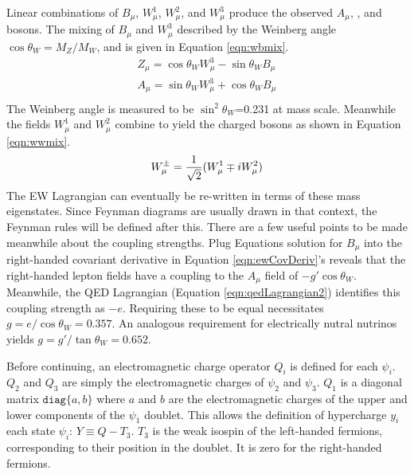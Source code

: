 Linear combinations of $B_\mu$, $W_\mu^1$, $W_\mu^2$, and $W_\mu^3$ produce the observed $A_\mu$, \Z, and \W bosons.
The mixing of $B_\mu$ and $W_\mu^3$ described by the Weinberg angle $\cos\theta_W=M_Z/M_W$, and is given in Equation \ref{eqn:wbmix}.
\begin{equation}\begin{split}\label{eqn:wbmix}
    Z_\mu=\cos\theta_W W^3_\mu-\sin\theta_W B_\mu \\
    A_\mu=\sin\theta_W W^3_\mu+\cos\theta_W B_\mu \\
\end{split}\end{equation}
The Weinberg angle is measured to be $\sin^2\theta_W$=0.231 at \Z mass scale.
Meanwhile the fields $W_\mu^1$ and $W_\mu^2$ combine to yield the charged \W bosons as shown in Equation \ref{eqn:wwmix}.
\begin{equation}\begin{split}\label{eqn:wwmix}
    W^\pm_\mu=\frac{1}{\sqrt{2}}(W_\mu^1\mp iW_\mu^2)
\end{split}\end{equation}
The EW Lagrangian can eventually be re-written in terms of these mass eigenstates.
Since Feynman diagrams are usually drawn in that context, the Feynman rules will be defined after this.
There are a few useful points to be made meanwhile about the coupling strengths.
Plug Equations \label{eqn:wbmix} solution for $B_\mu$ into the right-handed covariant derivative in Equation \ref{eqn:ewCovDeriv}'s reveals that the right-handed lepton fields have a coupling to the $A_\mu$ field of $-g'\cos\theta_W$.
Meanwhile, the QED Lagrangian (Equation \ref{eqn:qedLagrangian2}) identifies this coupling strength as $-e$.
Requiring these to be equal necessitates $g=e/\cos\theta_W=0.357$.
An analogous requirement for electrically nutral nutrinos yields $g=g'/\tan\theta_W=0.652$.

Before continuing, an electromagnetic charge operator $Q_i$ is defined for each $\psi_i$.
$Q_2$ and $Q_3$ are simply the electromagnetic charges of $\psi_2$ and $\psi_3$.
$Q_1$ is a diagonal matrix $\texttt{diag}\{a,b\}$ where $a$ and $b$ are the electromagnetic charges of the upper and lower components of the $\psi_1$ doublet.
This allows the definition of hypercharge $y_i$ each state $\psi_i$: $Y\equiv Q-T_3$.
$T_3$ is the weak isospin of the left-handed fermions, corresponding to their position in the doublet. It is zero for the right-handed fermions.

